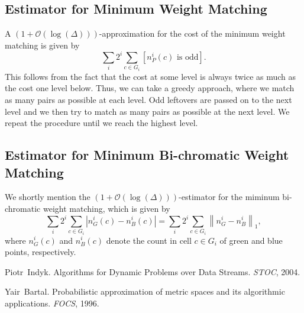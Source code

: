 \documentclass[11pt]{article}
\renewcommand{\O}{\mathcal{O}}
\newcommand{\norm}[1]{\left\lVert {#1} \right\rVert}
\newcommand{\abs}[1]{\left\lvert {#1} \right\rvert}
\begin{document}
\subsection{Estimator for Minimum Weight Matching}
A  $(1 + \O(\log(\Delta)))$-approximation for the cost of the minimum weight matching is given by
\begin{equation*}
	\sum_{i} 2^i \sum_{c \in G_i} [n_P^i(c) \text{ is odd}].
\end{equation*}
This follows from the fact that the cost at some level is always twice as much as the cost one level below. Thus, we can take a greedy approach, where we match as many pairs as possible at each level. Odd leftovers are passed on to the next level and we then try to match as many pairs as possible at the next level. We repeat the procedure until we reach the highest level. 

\subsection{Estimator for Minimum Bi-chromatic Weight Matching}
We shortly mention the  $(1 + \O(\log(\Delta)))$-estimator for the miminum bi-chromatic weight matching, which is given by
\begin{equation*}
	\sum_{i} 2^i \sum_{c \in G_i} \abs{n_G^i(c) - n_B^i(c)} = \sum_{i} 2^i \sum_{c \in G_i} \norm{n_G^i - n_B^i}_1,
\end{equation*}
where $n_G^i(c)$ and $n_B^i(c)$ denote the count in cell $c \in G_i$ of green and blue points, respectively. 




\begin{thebibliography}{42}

Piotr~Indyk.
\newblock Algorithms for Dynamic Problems over Data Streams.
\newblock \emph{STOC}, 2004.

Yair~Bartal.
\newblock Probabilistic approximation of metric spaces and its algorithmic applications.
\newblock \emph{FOCS}, 1996.

\end{thebibliography}
\end{document}
